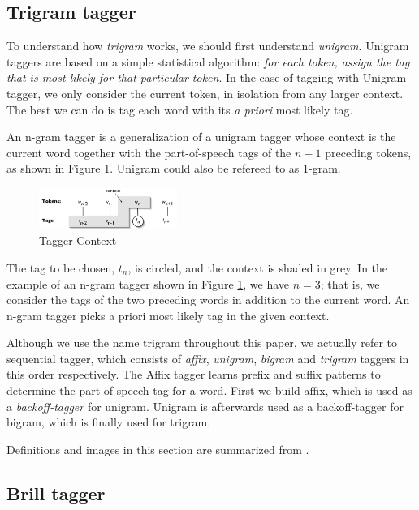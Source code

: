 \documentclass[10pt, conference, compsocconf]{IEEEtran}
\begin{document}
\subsection{Trigram tagger}
To understand how \textit{trigram} works, we should first understand \textit{unigram}.
Unigram taggers are based on a simple statistical algorithm: \textit{for each token, assign the tag that is most likely for that particular token}.
In the case of tagging with Unigram tagger, we only consider the current token, in isolation from any larger context. The best we can do is tag each word with its \textit{a priori} most likely tag.
\par
An n-gram tagger is a generalization of a unigram tagger whose context is the current word together with the part-of-speech tags of the $n-1$ preceding tokens, as shown in Figure \ref{fig:trigram}. Unigram could also be refereed to as 1-gram.

\begin{figure}[h]
\begin{center}
\includegraphics[width=0.4\textwidth]{tag-context.png} 
\end{center}
\caption{Tagger Context}
\label{fig:trigram}
\end{figure}

The tag to be chosen, $t_{n}$, is circled, and the context is shaded in grey.
In the example of an n-gram tagger shown in Figure \ref{fig:trigram}, we have $n=3$; that is, we consider the tags of the two preceding words in addition to the current word.
An n-gram tagger picks a priori most likely tag in the given context.
\par
Although we use the name trigram throughout this paper, we actually refer to sequential tagger, which consists of
\textit{affix}, \textit{unigram}, \textit{bigram} and \textit{trigram} taggers in this order respectively. The Affix tagger learns prefix and suffix patterns to determine the part of speech tag for a word. First we build affix, which is used as a \textit{backoff-tagger} for unigram. Unigram is afterwards used as a backoff-tagger for bigram, which is finally used for trigram.
\par
Definitions and images in this section are summarized from \cite{NLTKBOOK}.

\subsection{Brill tagger} %
\end{document}
